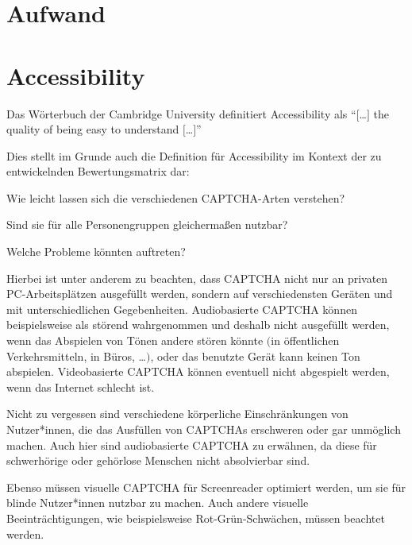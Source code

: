 
\section{Aufwand}
\label{ch:matrix:aufwand}


\section{Accessibility}
\label{ch:matrix:accessibility}
Das Wörterbuch der Cambridge University definitiert Accessibility als ``$[$\dots$]$ the quality of being easy to understand $[$\dots$]$'' \cite{CACD:2008}

Dies stellt im Grunde auch die Definition für Accessibility im Kontext der zu entwickelnden Bewertungsmatrix dar: 

Wie leicht lassen sich die verschiedenen CAPTCHA-Arten verstehen? 

Sind sie für alle Personengruppen gleichermaßen nutzbar? 

Welche Probleme könnten auftreten?

Hierbei ist unter anderem zu beachten, dass CAPTCHA nicht nur an privaten PC-Arbeitsplätzen ausgefüllt werden, 
sondern auf verschiedensten Geräten und mit unterschiedlichen Gegebenheiten. 
Audiobasierte CAPTCHA können beispielsweise als störend wahrgenommen und deshalb nicht ausgefüllt werden, 
wenn das Abspielen von Tönen andere stören könnte $($in öffentlichen Verkehrsmitteln, in Büros, \dots$)$, 
oder das benutzte Gerät kann keinen Ton abspielen. Videobasierte CAPTCHA können eventuell nicht abgespielt werden, 
wenn das Internet schlecht ist.

Nicht zu vergessen sind verschiedene körperliche Einschränkungen von Nutzer*innen, 
die das Ausfüllen von CAPTCHAs erschweren oder gar unmöglich machen. Auch hier sind audiobasierte CAPTCHA zu erwähnen, 
da diese für schwerhörige oder gehörlose Menschen nicht absolvierbar sind. 

Ebenso müssen visuelle CAPTCHA für Screenreader optimiert werden, um sie für blinde Nutzer*innen nutzbar zu machen. 
Auch andere visuelle Beeinträchtigungen, wie beispielsweise Rot-Grün-Schwächen, müssen beachtet werden.

